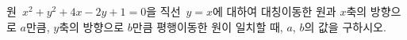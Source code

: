 원~$x^2+y^2+4x-2y+1=0$을 직선~$y=x$에 대하여 대칭이동한 원과 $x$축의 방향으로 $a$만큼, $y$축의 방향으로 $b$만큼 평행이동한 원이 일치할 때, $a$, $b$의 값을 구하시오.
